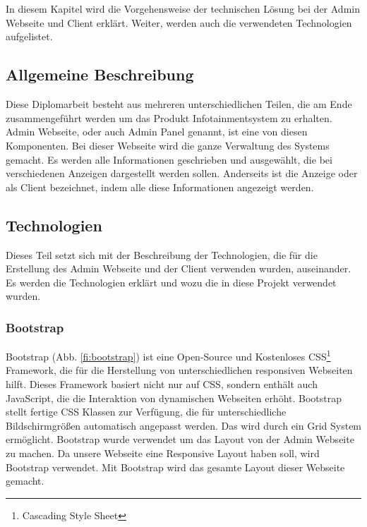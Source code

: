 \chapter{\docname}
\label{\docname}
In diesem Kapitel wird die Vorgehensweise der technischen L\"{o}sung bei der Admin Webseite und Client erkl\"{a}rt. Weiter, werden auch die verwendeten Technologien aufgelistet. 

\section{Allgemeine Beschreibung}

Diese Diplomarbeit besteht aus mehreren unterschiedlichen Teilen, die am Ende zusammengef\"{u}hrt werden um das Produkt Infotainmentsystem zu erhalten. Admin Webseite, oder auch Admin Panel genannt, ist eine von diesen Komponenten. Bei dieser Webseite wird die ganze Verwaltung des Systems gemacht. Es werden alle Informationen geschrieben und ausgew\"{a}hlt, die bei verschiedenen Anzeigen dargestellt werden sollen. Anderseits ist die Anzeige oder als Client bezeichnet, indem alle diese Informationen angezeigt werden. 


\section{Technologien}

Dieses Teil setzt sich mit der Beschreibung der Technologien, die f\"{u}r die Erstellung des Admin Webseite und der Client verwenden wurden, auseinander. Es werden die Technologien erkl\"{a}rt und wozu die in diese Projekt verwendet wurden.



\subsection{Bootstrap}
Bootstrap (Abb. \ref{fi:bootstrap}) ist eine Open-Source und Kostenloses CSS\footnote{Cascading Style Sheet} Framework, die f\"{u}r die Herstellung von unterschiedlichen responsiven Webseiten hilft. Dieses Framework basiert nicht nur auf CSS, sondern enth\"{a}lt auch JavaScript, die die Interaktion von dynamischen Webseiten erh\"{o}ht. Bootstrap stellt fertige CSS Klassen zur Verf\"{u}gung, die f\"{u}r unterschiedliche Bildschirmgr\"{o}\ss{}en automatisch angepasst werden. Das wird durch ein Grid System erm\"{o}glicht. Bootstrap wurde verwendet um das Layout von der Admin Webseite zu machen. Da unsere Webseite eine Responsive Layout haben soll, wird Bootstrap verwendet. Mit Bootstrap wird das gesamte Layout dieser Webseite gemacht.


